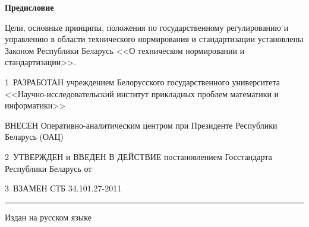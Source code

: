 \rule{0pt}{5mm}
	 
\centerline{\bf Предисловие} 

Цели, основные принципы, положения по государственному регулированию и 
управлению в области технического нормирования и стандартизации 
установлены Законом Республики Беларусь <<О техническом нормировании и 
стандартизации>>.  

\vskip0.2cm

1~РАЗРАБОТАН учреждением Белорусского государственного университета
<<Науч\-но-исследовательский институт прикладных проблем математики и информатики>>

ВНЕСЕН Оперативно-аналитическим центром при Президенте Республики Беларусь (ОАЦ)

2~УТВЕРЖДЕН и ВВЕДЕН В ДЕЙСТВИЕ постановлением Госстандарта Республики 
Беларусь от $\phantom{\text{25 ноября 2011 г.}}$ \No~$\phantom{\text{83}}$ 

3~ВЗАМЕН СТБ 34.101.27-2011

\vfill

\hrule
\vskip1mm
Издан на русском языке

\pagebreak
